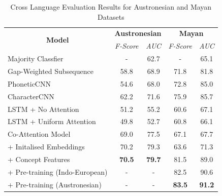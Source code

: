 \documentclass[11pt,letterpaper]{article}
\begin{document}
\begin{table}[t]
\centering
\begin{tabular}{lcccc}
\multicolumn{1}{c}{\multirow{2}{*}{\textbf{Model}}} & \multicolumn{2}{c}{\textbf{Austronesian}} & \multicolumn{2}{c}{\textbf{Mayan}} \\ \cline{2-5} 
\multicolumn{1}{c}{}                                & \textit{F-Score}      & \textit{AUC}      & \textit{F-Score}  & \textit{AUC}   \\ \hline
Majority Classfier                                  & -                     & 62.7              & -                 & 65.1           \\
Gap-Weighted Subsequence                            & 58.8                  & 68.9              & 71.8              & 81.8           \\
PhoneticCNN                                         & 54.6                  & 68.0              & 72.8              & 85.0           \\
CharacterCNN                                        & 62.2                  & 71.6              & 75.9              & 85.7           \\
LSTM + No Attention                                 & 51.2                  & 55.2              & 60.6              & 67.1           \\
LSTM + Uniform Attention                            & 49.8                  & 52.7              & 60.8              & 66.1           \\ \hline
Co-Attention Model                                  & 69.0                  & 77.5              & 67.1              & 67.7           \\
\hline
+ Initalised Embeddings                             & 70.2                  & 79.3              & 63.6              & 71.3           \\
+ Concept Features                                  & \textbf{70.5}         & \textbf{79.7}     & 81.5              & 89.0           \\
\hline
+ Pre-training (Indo-European)                      & -                     & -                 & 82.5              & 90.6           \\
\hline
+ Pre-training (Austronesian)                       & -                     & -                 & \textbf{83.5}     & \textbf{91.2} 
\end{tabular}
\caption{Cross Language Evaluation Results for Austronesian and Mayan Datasets}
\label{CL_res_2}
\end{table}
\end{document}
